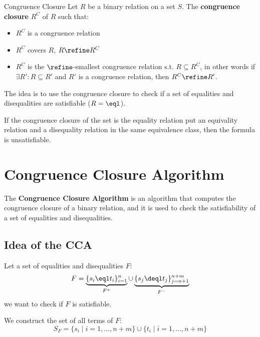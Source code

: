 \begin{definition}{Congruence Closure}
    Let $R$ be a binary relation on a set $S$.
    The \textbf{congruence closure} $R^C$ of $R$ such that:   
    \begin{itemize}
        \item $R^C$ is a congruence relation
        \item $R^C$ covers $R$, $R \refine R^C$
        \item $R^C$ is the $\refine$-smallest congruence relation 
        s.t. $R \subseteq R^C$, in other words
        if $\exists R': R \subseteq R'$ and $R'$ is a congruence relation, 
        then $R^C \refine R'$.    
    \end{itemize}
\end{definition}

The idea is to use the congruence closure to check if a set of equalities and disequalities
are satisfiable ($R = \eql$).

If the congruence closure of the set is the equality relation put 
an equivality relation and a disequality relation in the same 
equivalence class, then the formula is unsatisfiable.

\section{Congruence Closure Algorithm}
\label{sec:Congruence Closure Algorithm}

The \textbf{Congruence Closure Algorithm} is an algorithm that computes the
congruence closure of a binary relation, and it is used to check the satisfiability
of a set of equalities and disequalities.

\subsection{Idea of the CCA}
\label{subsec:Idea of the CCA}

Let a set of equalities and disequalities $F$:
\begin{equation*}
    F = \underbrace{\{ s_i \eql t_i \}_{i=1}^{n}}_{F^+} 
    \cup \underbrace{\{ s_j \deql t_j \}_{j=n+1}^{n+m}}_{F^-}
\end{equation*}
we want to check if $F$ is satisfiable.

We construct the set of all terms of $F$:
\begin{equation*}
    S_F = \{ s_i \; | \; i = 1, \dots, n+m\} \cup \{ t_i \; | \; i = 1, \dots, n+m\}
\end{equation*}
    
